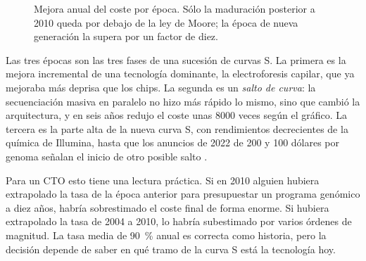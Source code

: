 \documentclass[11pt,letterpaper]{article}
\begin{document}
\begin{figure}[htbp]
\centering
{}
\caption{Mejora anual del coste por época. Sólo la maduración posterior a 2010
queda por debajo de la ley de Moore; la época de nueva generación la supera
por un factor de diez.}
\label{fig:eras}
\end{figure}

Las tres épocas son las tres fases de una sucesión de curvas S. La primera es
la mejora incremental de una tecnología dominante, la electroforesis capilar,
que ya mejoraba más deprisa que los chips. La segunda es un \emph{salto de
curva}: la secuenciación masiva en paralelo no hizo más rápido lo mismo, sino
que cambió la arquitectura, y en seis años redujo el coste unas \num{8000}
veces según el gráfico. La tercera es la parte alta de la nueva curva S, con
rendimientos decrecientes de la química de Illumina, hasta que los anuncios de
2022 de 200 y 100 dólares por genoma señalan el inicio de otro posible salto
\parencite{illumina2022,ultima2022}.

Para un CTO esto tiene una lectura práctica. Si en 2010 alguien hubiera
extrapolado la tasa de la época anterior para presupuestar un programa
genómico a diez años, habría sobrestimado el coste final de forma enorme. Si
hubiera extrapolado la tasa de 2004 a 2010, lo habría subestimado por varios
órdenes de magnitud. La tasa media de 90~\% anual es correcta como historia,
pero la decisión depende de saber en qué tramo de la curva S está la
tecnología hoy.
\end{document}

